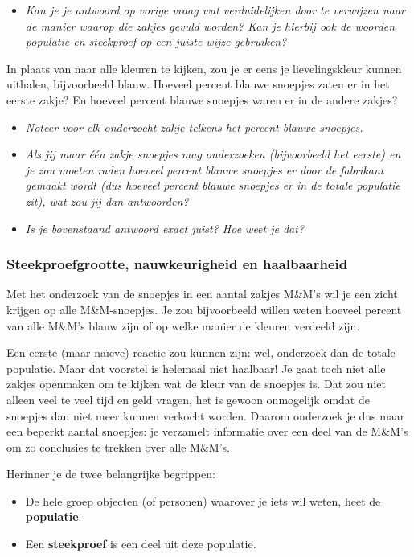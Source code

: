 \documentclass[11pt]{article}
\newcommand{\vraag}[2]{\begin{itemize}\item {\it #1} \vspace*{#2}\end{itemize}}
\begin{document}
\vraag{Kan je je antwoord op vorige vraag wat verduidelijken door te verwijzen naar de manier
waarop die zakjes gevuld worden? Kan je hierbij ook de woorden populatie en steekproef op
een juiste wijze gebruiken?}{3cm}

In plaats van naar alle kleuren te kijken, zou je er eens je lievelingskleur kunnen uithalen,
bijvoorbeeld blauw. Hoeveel percent blauwe snoepjes zaten er in het eerste zakje? En hoeveel percent
blauwe snoepjes waren er in de andere zakjes?

\vraag{Noteer voor elk onderzocht zakje telkens het percent blauwe snoepjes.}{5cm}

\vraag{Als jij maar één zakje snoepjes mag onderzoeken (bijvoorbeeld het eerste) en je zou moeten raden hoeveel
percent blauwe snoepjes er door de fabrikant gemaakt wordt (dus hoeveel percent blauwe
snoepjes er in de totale populatie zit), wat zou jij dan antwoorden?}{4cm}

\vraag{Is je bovenstaand antwoord exact juist? Hoe weet je dat?}{3cm}

\subsubsection{Steekproefgrootte, nauwkeurigheid en haalbaarheid}

Met het onderzoek van de snoepjes in een aantal zakjes M\&M’s wil je een zicht krijgen op alle
M\&M-snoepjes. Je zou bijvoorbeeld willen weten hoeveel percent van alle M\&M’s blauw zijn of op
welke manier de kleuren verdeeld zijn.

Een eerste (maar naïeve) reactie zou kunnen zijn: wel, onderzoek dan de totale populatie. Maar dat
voorstel is helemaal niet haalbaar! Je gaat toch niet alle zakjes openmaken om te kijken wat de kleur
van de snoepjes is. Dat zou niet alleen veel te veel tijd en geld vragen, het is gewoon onmogelijk
omdat de snoepjes dan niet meer kunnen verkocht worden. Daarom onderzoek je dus maar een
beperkt aantal snoepjes: je verzamelt informatie over een deel van de M\&M’s om zo conclusies te
trekken over alle M\&M’s.

Herinner je de twee belangrijke begrippen:
\begin{itemize}
  \item De hele groep objecten (of personen) waarover je iets wil weten, heet de {\bf populatie}.
  \item Een {\bf steekproef} is een deel uit deze populatie.
\end{itemize}
\end{document}
